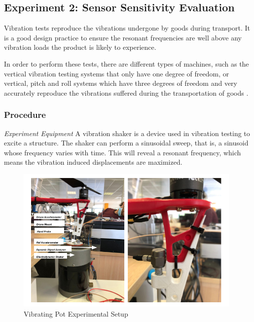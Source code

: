

\subsection{Experiment 2: Sensor Sensitivity Evaluation}

Vibration tests reproduce the vibrations undergone by goods during transport. It is a good design practice to ensure the resonant frequencies are well above any vibration loads the product is likely to experience.

In order to perform these tests, there are different types of machines, such as the vertical vibration testing systems that only have one degree of freedom, or vertical, pitch and roll systems which have three degrees of freedom and very accurately reproduce the vibrations suffered during the transportation of goods \cite{safe_load_testing_technologies_2021}. 

\subsubsection{Procedure}
\textit{Experiment Equipment}\hspace{0.3cm} A vibration shaker is a device used in vibration testing to excite a structure. The shaker can perform a sinusoidal sweep, that is, a sinusoid whose frequency varies with time. This will reveal a resonant frequency, which means the vibration induced displacements are maximized. 

\begin{figure}[!h]
    \raggedright
    \includegraphics[width=11cm]{images/stage_graphs/vibration_results/vibration_test_drone.png}
    \caption{Vibrating Pot Experimental Setup}
\end{figure}

